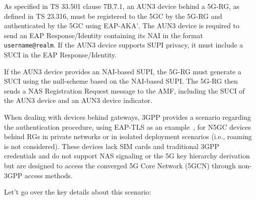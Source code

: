 As specified in \ac{TS 33.501} clause 7B.7.1, an \ac{AUN3} device behind a \ac{5G-RG}, as defined in \ac{TS 23.316}, must be registered to the \ac{5GC} by the \ac{5G-RG} and authenticated by the \ac{5GC} using \ac{EAP-AKA'}. The \ac{AUN3} device is required to send an \ac{EAP} Response/Identity containing its \ac{NAI} in the format \texttt{username@realm}. If the \ac{AUN3} device supports \ac{SUPI} privacy, it must include a \ac{SUCI} in the \ac{EAP} Response/Identity.

If the \ac{AUN3} device provides an \ac{NAI}-based \ac{SUPI}, the \ac{5G-RG} must generate a \ac{SUCI} using the null-scheme based on the \ac{NAI}-based \ac{SUPI}. The \ac{5G-RG} then sends a \ac{NAS} Registration Request message to the \ac{AMF}, including the \ac{SUCI} of the \ac{AUN3} device and an \ac{AUN3} device indicator.

When dealing with devices behind gateways, 3GPP provides a scenario regarding the authentication procedure, using EAP-TLS as an example~\cite{TS 33.501 Annex O}, for \ac{N5GC} devices behind \acp{RG} in private networks or in isolated deployment scenarios (i.e., roaming is not considered). These devices lack \ac{SIM} cards and traditional \ac{3GPP} credentials and do not support \ac{NAS} signaling or the \ac{5G} key hierarchy derivation but are designed to access the converged \ac{5G} Core Network (\ac{5GCN}) through non-\ac{3GPP} access methods.

Let't go over the key details about this scenario:

